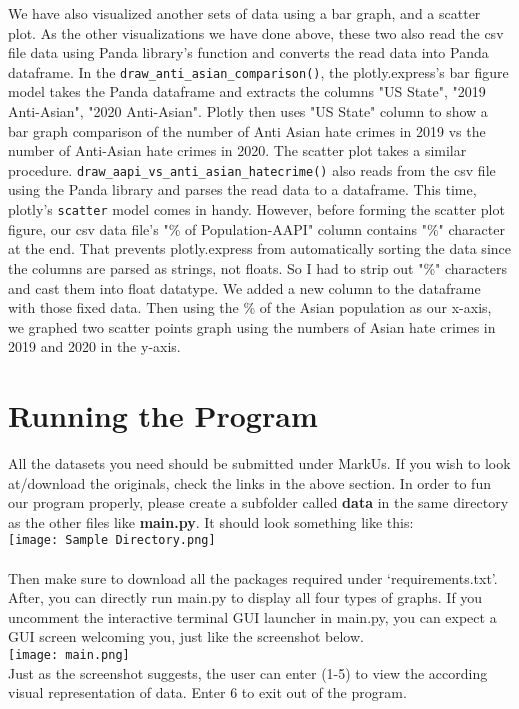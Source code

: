 \documentclass[fontsize=11pt]{article}
\begin{document}
\quad We have also visualized another sets of data using a bar graph, and a scatter plot. As the other visualizations we have done above, these two also read the csv file data using Panda library's function and converts the read data into Panda dataframe. In the \texttt{draw\_anti\_asian\_comparison()}, the plotly.express's bar figure model takes the Panda dataframe and extracts the columns "US State", "2019 Anti-Asian", "2020 Anti-Asian". Plotly then uses "US State" column to show a bar graph comparison of the number of Anti Asian hate crimes in 2019 vs the number of Anti-Asian hate crimes in 2020. The scatter plot takes a similar procedure. \texttt{draw\_aapi\_vs\_anti\_asian\_hatecrime()} also reads from the csv file using the Panda library and parses the read data to a dataframe. This time, plotly's \texttt{scatter} model comes in handy. However, before forming the scatter plot figure, our csv data file's "\% of Population-AAPI" column contains "\%" character at the end. That prevents plotly.express from automatically sorting the data since the columns are parsed as strings, not floats. So I had to strip out "\%" characters and cast them into float datatype. We added a new column to the dataframe with those fixed data. Then using the \% of the Asian population as our x-axis, we graphed two scatter points graph using the numbers of Asian hate crimes in 2019 and 2020 in the y-axis.

\section*{Running the Program}

\quad All the datasets you need should be submitted under MarkUs. If you wish to look at/download the originals, check the links in the above section. In order to fun our program properly, please create a subfolder called \textbf{data} in the same directory as the other files like \textbf{main.py}. It should look something like this:\\ \texttt{[image: Sample Directory.png]}
\\
\\
Then make sure to download all the packages required under `requirements.txt'. After, you can directly run main.py to display all four types of graphs. If you uncomment the interactive terminal GUI launcher in main.py, you can expect a GUI screen welcoming you, just like the screenshot below.
\\
\texttt{[image: main.png]}
\\
Just as the screenshot suggests, the user can enter (1-5) to view the according visual representation of data. Enter 6 to exit out of the program.
\\
\end{document}
